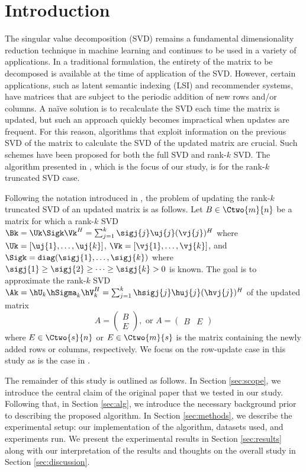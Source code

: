 
\section{Introduction} \label{sec:intro}

The singular value decomposition (SVD) remains a fundamental dimensionality reduction technique in machine learning and continues to be used in a variety of applications. In a traditional formulation, the entirety of the matrix to be decomposed is available at the time of application of the SVD. However, certain applications, such as latent semantic indexing (LSI) and recommender systems, have matrices that are subject to the periodic addition of new rows and/or columns. A na\"{i}ve solution is to recalculate the SVD each time the matrix is updated, but such an approach quickly becomes impractical when updates are frequent. For this reason, algorithms that exploit information on the previous SVD of the matrix to calculate the SVD of the updated matrix are crucial. Such schemes have been proposed for both the full SVD and rank-$k$ SVD. The algorithm presented in \cite{Kalantzis2021}, which is the focus of our study, is for the rank-$k$ truncated SVD case.

Following the notation introduced in \cite{Kalantzis2021}, the problem of updating the rank-$k$ truncated SVD of an updated matrix is as follows. Let $B\in\Ctwo{m}{n}$ be a matrix for which a rank-$k$ SVD $\Bk = \Uk \Sigk \Vk^H = \sum_{j=1}^k \sigj{j} \uj{j} (\vj{j})^H$ where $\Uk = [\uj{1}, \dots, \uj{k}]$, $\Vk = [\vj{1}, \dots, \vj{k}]$, and $\Sigk = \verb|diag| (\sigj{1}, \dots, \sigj{k})$ where $\sigj{1} \geq \sigj{2} \geq \dots \geq \sigj{k} > 0$ is known. The goal is to approximate the rank-$k$ SVD $\Ak = \hU_k \hSigma_k \hV_k^H = \sum_{j=1}^k \hsigj{j} \huj{j} (\hvj{j})^H$ of the updated matrix
\begin{equation*}
    A= 
    \begin{pmatrix}
        B \\ E
    \end{pmatrix},\text{ or }
    A=
    \begin{pmatrix}
        B & E
    \end{pmatrix}
\end{equation*}
where $E\in\Ctwo{s}{n}$ or $E\in\Ctwo{m}{s}$ is the matrix containing the newly added rows or columns, respectively. We focus on the row-update case in this study as is the case in \cite{Kalantzis2021}.

The remainder of this study is outlined as follows. In Section \ref{sec:scope}, we introduce the central claim of the original paper that we tested in our study. Following that, in Section \ref{sec:alg}, we introduce the necessary background prior to describing the proposed algorithm. In Section \ref{sec:methods}, we describe the experimental setup: our implementation of the algorithm, datasets used, and experiments run. We present the experimental results in Section \ref{sec:results} along with our interpretation of the results and thoughts on the overall study in Section \ref{sec:discussion}.